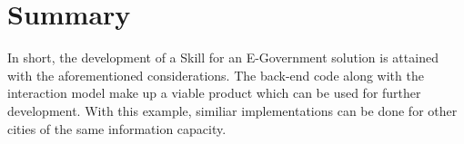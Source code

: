 \section{Summary}

In short, the development of a Skill for an E-Government solution is attained with the aforementioned considerations. The back-end code along with the interaction model make up a viable product which can be used for further development. %
With this example, similiar implementations can be done for other cities of the same information capacity.


